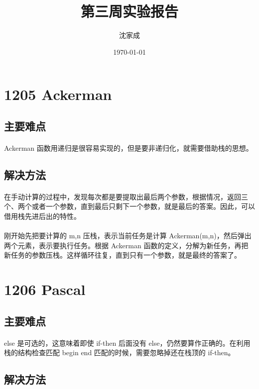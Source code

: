 \documentclass[UTF-8, 12pt]{ctexart}
\title{第三周实验报告}
\author{沈家成}
\date{\today}
\begin{document}
\maketitle
\section{1205 Ackerman}
    \subsection{主要难点}
    \paragraph{}
    Ackerman 函数用递归是很容易实现的，但是要非递归化，就需要借助栈的思想。
    \subsection{解决方法}
    \paragraph{}
    在手动计算的过程中，发现每次都是要提取出最后两个参数，根据情况，返回三个、两个或者一个参数，直到最后只剩下一个参数，就是最后的答案。因此，可以借用栈先进后出的特性。
    \paragraph{}
    刚开始先把要计算的 m,n 压栈，表示当前任务是计算 Ackerman(m,n)，然后弹出两个元素，表示要执行任务。根据 Ackerman 函数的定义，分解为新任务，再把新任务的参数压栈。这样循环往复，直到只有一个参数，就是最终的答案了。

\section{1206 Pascal}
    \subsection{主要难点}
    \paragraph{}
    else 是可选的，这意味着即使 if-then 后面没有 else，仍然要算作正确的。在利用栈的结构检查匹配 begin end 匹配的时候，需要忽略掉还在栈顶的 if-then。
    \subsection{解决方法}
\end{document}
